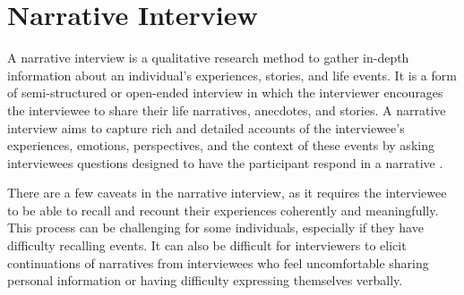 
\section{Narrative Interview}
A narrative interview is a qualitative research method to gather in-depth information about an individual's experiences, stories, and life events. It is a form of semi-structured or open-ended interview in which the interviewer encourages the interviewee to share their life narratives, anecdotes, and stories. A narrative interview aims to capture rich and detailed accounts of the interviewee's experiences, emotions, perspectives, and the context of these events by asking interviewees questions designed to have the participant respond in a narrative \cite{Jovchelovitch2000-xs}.

There are a few caveats in the narrative interview, as it requires the interviewee to be able to recall and recount their experiences coherently and meaningfully. This process can be challenging for some individuals, especially if they have difficulty recalling events. It can also be difficult for interviewers to elicit continuations of narratives from interviewees who feel uncomfortable sharing personal information or having difficulty expressing themselves verbally. \cite{Sammantha2021-na}


